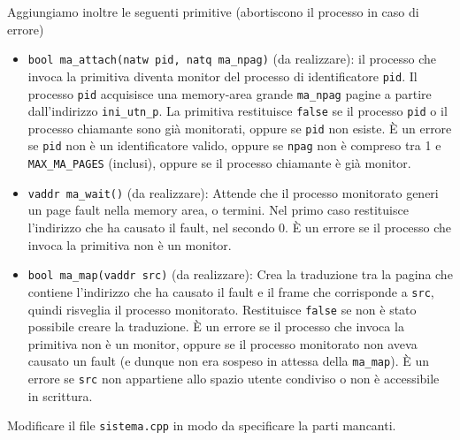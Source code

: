 Aggiungiamo inoltre le seguenti primitive (abortiscono il processo in caso di errore)
\begin{itemize}
  \item \verb|bool ma_attach(natw pid, natq ma_npag)| (da realizzare):
    il processo che invoca la primitiva diventa monitor del processo di
    identificatore \verb|pid|. Il processo \verb|pid| acquisisce una memory-area
    grande \verb|ma_npag| pagine a partire dall'indirizzo \verb|ini_utn_p|.
    La primitiva restituisce \verb|false| se il processo \verb|pid| o il processo
    chiamante sono gi\`a monitorati, oppure se \verb|pid| non esiste.
    \`E un errore se \verb|pid| non \`e un identificatore valido, oppure se \verb|npag|
    non \`e compreso tra 1 e \verb|MAX_MA_PAGES| (inclusi), oppure se il processo
    chiamante \`e gi\`a monitor.
  \item \verb|vaddr ma_wait()| (da realizzare):
    Attende che il processo monitorato generi un page fault nella memory area, o termini.
    Nel primo caso restituisce l'indirizzo che ha causato il fault, nel secondo 0.
    \`E un errore se il processo che invoca la primitiva non \`e un monitor.
  \item \verb|bool ma_map(vaddr src)| (da realizzare):
    Crea la traduzione tra la pagina che contiene l'indirizzo che ha causato il fault
    e il frame che corrisponde a \verb|src|, quindi risveglia il processo monitorato.
    Restituisce \verb|false| se non \`e stato possibile creare la traduzione.
    \`E un errore se il processo che invoca la primitiva non \`e un monitor, oppure
    se il processo monitorato non aveva causato un fault (e dunque non era sospeso
    in attessa della \verb|ma_map|). \`E un errore se \verb|src| non appartiene
    allo spazio utente condiviso o non \`e accessibile in scrittura.
\end{itemize}

Modificare il file \verb|sistema.cpp| in modo da specificare la parti mancanti.
